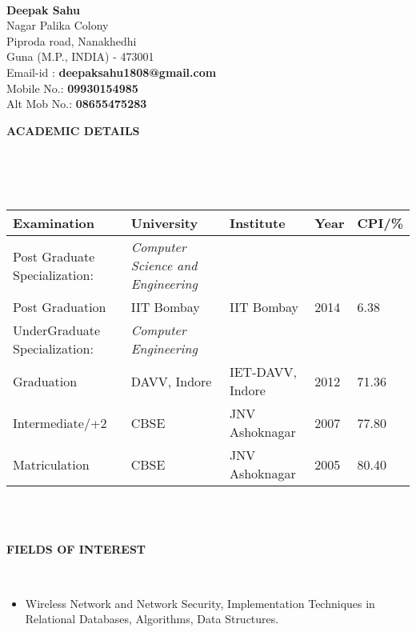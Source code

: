 \documentclass[letterpaper,10pt]{article}
\newcommand{\lsep}{-0.5cm}
\newcommand{\resheading}[1]{{\small \colorbox{mygrey}{\begin{minipage}{0.975\textwidth}{\textbf{#1 \vphantom{p\^{E}}}}\end{minipage}}}}
\begin{document}
\hspace{0.5cm}\\[-0.2cm]

\textbf{\Huge Deepak Sahu} \\
\indent Nagar Palika Colony \\
\indent Piproda road, Nanakhedhi \\
\indent Guna (M.P., INDIA) - 473001 \\
\indent Email-id : \textbf{deepaksahu1808@gmail.com} \\
\indent Mobile No.: \textbf{09930154985} \\
\indent Alt Mob No.: \textbf{08655475283} \\

\resheading{\textbf{ACADEMIC DETAILS} }\\[\lsep]
\\ \\
\indent \begin{tabular}{ l @{\hskip 0.15in} l @{\hskip 0.15in} l @{\hskip 0.15in} l @{\hskip 0.15in} l }
\hline
\textbf{Examination} & \textbf{University} & \textbf{Institute} & \textbf{Year} & \textbf{CPI/\%} \\
\hline
Post Graduate Specialization:\,\, & \textit{Computer Science and Engineering} \\
Post Graduation & IIT Bombay & IIT Bombay & 2014 & 6.38 \\
UnderGraduate Specialization: & \textit{Computer Engineering} \\
Graduation & DAVV, Indore & IET-DAVV, Indore & 2012 & 71.36 \\
Intermediate/+2 & CBSE & JNV Ashoknagar & 2007 & 77.80 \\
Matriculation & CBSE & JNV Ashoknagar & 2005 & 80.40 \\
\hline
\end{tabular}
\\ \\

\resheading{\textbf{FIELDS OF INTEREST} }\\[\lsep]
\begin{itemize}
\item \noindent Wireless Network and Network Security, Implementation Techniques in Relational Databases, Algorithms, Data Structures.
\end{itemize}
\end{document}

